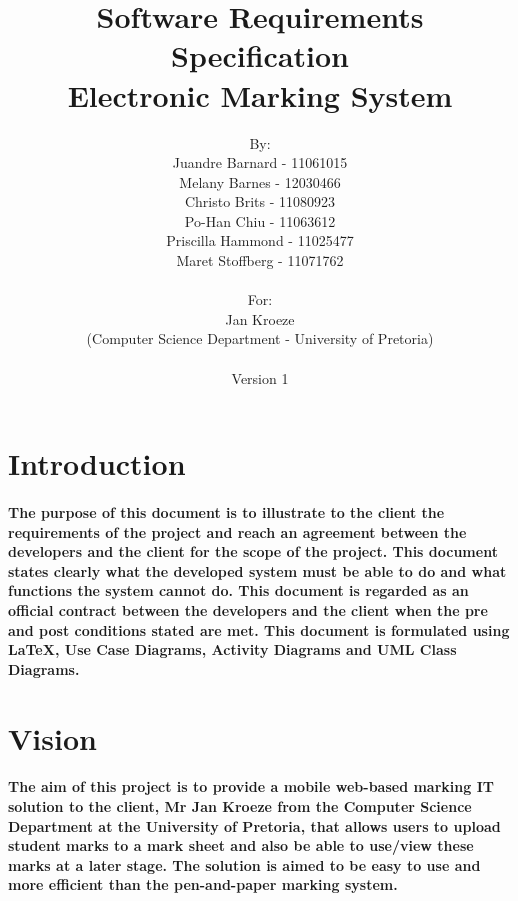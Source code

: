 \documentclass[12pt]{article}
\begin{document}
\title{Software Requirements Specification\\
Electronic Marking System}
\author{By: \\ Juandre Barnard - 11061015 \\ Melany Barnes - 12030466 \\ Christo Brits - 11080923 \\ Po-Han Chiu - 11063612 \\ Priscilla Hammond - 11025477 \\ Maret Stoffberg - 11071762 \\ \\ For: \\ Jan Kroeze \\ (Computer Science Department - University of Pretoria) \\ \\ Version 1 \\}
  \maketitle   \pagebreak
  \tableofcontents
  \pagebreak
  \section{Introduction}
  \paragraph*{The purpose of this document is to illustrate to the client the requirements of the project and reach an agreement between the developers and the client for the scope of the project. This document states clearly what the developed system must be able to do and what functions the system cannot do. This document is regarded as an official contract between the developers and the client when the pre and post conditions stated are met. This document is formulated using LaTeX, Use Case Diagrams, Activity Diagrams and UML Class Diagrams.}
  \section{Vision}
  \paragraph*{The aim of this project is to provide a mobile web-based marking IT solution to the client, Mr Jan Kroeze from the Computer Science Department at the University of Pretoria, that allows users to upload student marks to a mark sheet and also be able to use/view these marks at a later stage. The solution is aimed to be easy to use and more efficient than the pen-and-paper marking system.}
\end{document}
